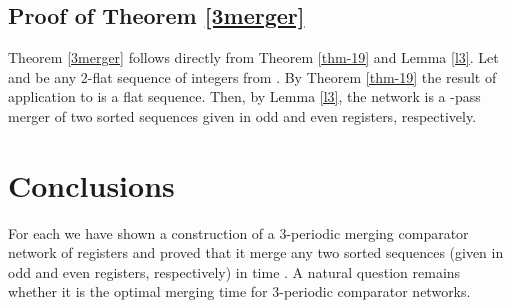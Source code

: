 \documentclass{llncs}
\begin{document}
\subsection{Proof of Theorem \ref{3merger}}  

Theorem \ref{3merger} follows directly from Theorem \ref{thm-19} and Lemma
\ref{l3}. Let  and  be any 2-flat sequence of integers
from . By Theorem \ref{thm-19} the result of application
 to  is a flat sequence.
Then, by Lemma \ref {l3}, the network  is a -pass merger of two 
sorted sequences given in odd and even registers, respectively.

\section{Conclusions}

For each  we have shown a construction of a 3-periodic merging
comparator network of  registers and proved that it merge any
two sorted sequences (given in odd and even registers, respectively) in time
. A natural question remains whether it is the optimal merging
time for 3-periodic comparator networks.
\end{document}
